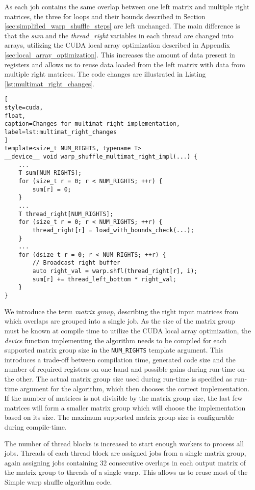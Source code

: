 As each job contains the same overlap between one left matrix and multiple right matrices, the three for loops and their bounds described in Section \ref{sec:simplified_warp_shuffle_steps} are left unchanged. The main difference is that the \textit{sum} and the \textit{thread\_right} variables in each thread are changed into arrays, utilizing the CUDA local array optimization described in Appendix \ref{sec:local_array_optimization}. This increases the amount of data present in registers and allows us to reuse data loaded from the left matrix with data from multiple right matrices. The code changes are illustrated in Listing \ref{lst:multimat_right_changes}.

\begin{lstlisting}[
style=cuda,
float,
caption=Changes for multimat right implementation,
label=lst:multimat_right_changes
]
template<size_t NUM_RIGHTS, typename T>
__device__ void warp_shuffle_multimat_right_impl(...) {
	...
	T sum[NUM_RIGHTS];
	for (size_t r = 0; r < NUM_RIGHTS; ++r) {
		sum[r] = 0;
	}
	...
	T thread_right[NUM_RIGHTS];
	for (size_t r = 0; r < NUM_RIGHTS; ++r) {
		thread_right[r] = load_with_bounds_check(...);
	}
	...
	for (dsize_t r = 0; r < NUM_RIGHTS; ++r) {
		// Broadcast right buffer
		auto right_val = warp.shfl(thread_right[r], i);
		sum[r] += thread_left_bottom * right_val;
	}
}
\end{lstlisting}

We introduce the term \textit{matrix group}, describing the right input matrices from which overlaps are grouped into a single job. As the size of the matrix group must be known at compile time to utilize the CUDA local array optimization, the \textit{device} function implementing the algorithm needs to be compiled for each supported matrix group size in the \texttt{NUM\_RIGHTS} template argument. This introduces a trade-off between compilation time, generated code size and the number of required registers on one hand and possible gains during run-time on the other. The actual matrix group size used during run-time is specified as run-time argument for the algorithm, which then chooses the correct implementation. If the number of matrices is not divisible by the matrix group size, the last few matrices will form a smaller matrix group which will choose the implementation based on its size. The maximum supported matrix group size is configurable during compile-time.

The number of thread blocks is increased to start enough workers to process all jobs. Threads of each thread block are assigned jobs from a single matrix group, again assigning jobs containing 32 consecutive overlaps in each output matrix of the matrix group to threads of a single warp. This allows us to reuse most of the Simple warp shuffle algorithm code.

